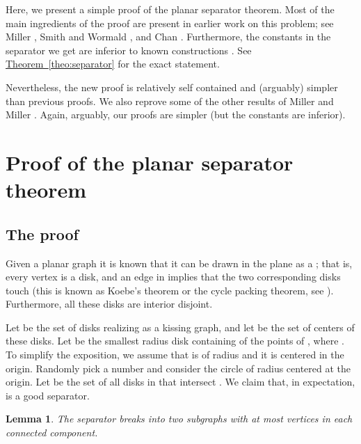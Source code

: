 \documentclass[12pt]{article}
\newtheorem{lemma}[theorem]{Lemma}
\theoremstyle{remark}\theoremheaderfont{\sf}\theorembodyfont{\upshape}\newtheorem{defn}[theorem]{Definition}
\newcommand{\HLink}[2]{\hyperref[#2]{#1~\ref*{#2}}}
\newcommand{\seclab}[1]{\label{sec:#1}}
\newcommand{\lemlab}[1]{\label{lemma:#1}}
\newcommand{\thmref}[1]{\HLink{Theorem}{theo:#1}}
\newcommand{\emphi}[1]{\emphic{#1}{#1}}
\begin{document}
Here, we present a simple proof of the planar separator theorem.  Most
of the main ingredients of the proof are present in earlier work on
this problem; see Miller \etal \cite{mttv-sspnng-97}, Smith and
Wormald \cite{sw-gsta-98}, and Chan \cite{c-ptasp-03}. Furthermore,
the constants in the separator we get are inferior to known
constructions \cite{ast-ps-94}. See \thmref{separator} for the exact
statement.


Nevertheless, the new proof is relatively self contained and
(arguably) simpler than previous proofs.  We also reprove some of the
other results of Miller \etal \cite{mttv-sspnng-97} and Miller
\cite{m-fsscs-86}. Again, arguably, our proofs are simpler (but the
constants are inferior).

\section{Proof of the planar separator theorem}

\subsection{The proof}
\seclab{proof}

Given a planar graph  it is known that it can be drawn
in the plane as a \emphi{kissing graph}; that is, every vertex is a
disk, and an edge in  implies that the two corresponding disks
touch (this is known as Koebe's theorem or the cycle packing theorem,
see \cite{pa-cg-95}). Furthermore, all these disks are interior
disjoint.

Let  be the set of disks realizing  as a kissing graph,
and let  be the set of centers of these disks.  Let 
be the smallest radius disk containing  of the points of
, where . To simplify the
exposition, we assume that  is of radius  and it is centered
in the origin. Randomly pick a number  and consider the
circle  of radius  centered at the origin.  Let  be the set
of all disks in  that intersect . We claim that, in
expectation,  is a good separator.

\begin{lemma}
    \lemlab{separates}The separator  breaks  into two subgraphs with at most
     vertices in each connected component.
\end{lemma}
\end{document}
